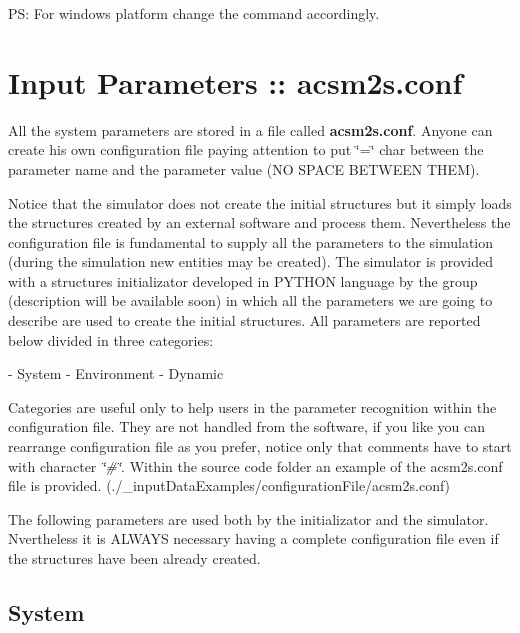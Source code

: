 P\-S\-: For windows platform change the command accordingly.

\par
\par
 \hypertarget{a00002_parameters}{}\section{Input Parameters \-:: acsm2s.\-conf}\label{a00002_parameters}


 All the system parameters are stored in a file called {\bfseries acsm2s.\-conf}. Anyone can create his own configuration file paying attention to put \char`\"{}=\char`\"{} char between the parameter name and the parameter value (N\-O S\-P\-A\-C\-E B\-E\-T\-W\-E\-E\-N T\-H\-E\-M).\par
 Notice that the simulator does not create the initial structures but it simply loads the structures created by an external software and process them. Nevertheless the configuration file is fundamental to supply all the parameters to the simulation (during the simulation new entities may be created). The simulator is provided with a structures initializator developed in P\-Y\-T\-H\-O\-N language by the group (description will be available soon) in which all the parameters we are going to describe are used to create the initial structures. All parameters are reported below divided in three categories\-: \begin{DoxyVerb}           - System
           - Environment
           - Dynamic
\end{DoxyVerb}


Categories are useful only to help users in the parameter recognition within the configuration file. They are not handled from the software, if you like you can rearrange configuration file as you prefer, notice only that comments have to start with character {\itshape \char`\"{}\#\char`\"{}}. Within the source code folder an example of the acsm2s.\-conf file is provided. (./\-\_\-input\-Data\-Examples/configuration\-File/acsm2s.conf)\par
 The following parameters are used both by the initializator and the simulator. Nvertheless it is A\-L\-W\-A\-Y\-S necessary having a complete configuration file even if the structures have been already created.\hypertarget{a00002_paramsystem}{}\subsection{System}\label{a00002_paramsystem}

